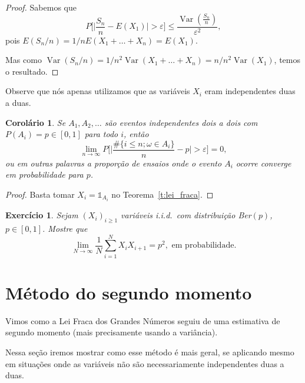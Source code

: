 \documentclass[reqno, draft]{book}
\newcommand*\1{\mathds{1}}
\newtheorem{corollary}[theorem]{Corolário}
\newtheorem{exercise}[example]{Exercício}
\DeclareMathOperator{\Var}{Var}
\def \iid{i.i.d.~}
\begin{document}
\begin{proof}
  Sabemos que
  \begin{equation}
    P \Big[\Big| \frac{S_n}{n} - E(X_1)\Big| > \varepsilon \Big] \leq \frac{\Var(\tfrac{S_n}{n})}{\varepsilon^2},
  \end{equation}
  pois $E(S_n/n) = 1/n E(X_1 + \dots + X_n) = E(X_1)$.

  Mas como $\Var(S_n/n) = 1/n^2 \Var (X_1 + \dots + X_n) = n/n^2 \Var(X_1)$, temos o resultado.
\end{proof}

Observe que nós apenas utilizamos que as variáveis $X_i$ eram independentes duas a duas.

\begin{corollary}
  Se $A_1, A_2, \dots$ são eventos independentes dois a dois com $P(A_i) = p \in [0,1]$ para todo $i$, então
  \begin{equation}
    \lim_{n \to \infty} P \Big[ \Big| \frac{\#\{i \leq n; \omega \in A_i\}}{n} - p \Big| > \varepsilon \Big] = 0,
  \end{equation}
  ou em outras palavras a proporção de ensaios onde o evento $A_i$ ocorre converge em probabilidade para $p$.
\end{corollary}

\begin{proof}
  Basta tomar $X_i = \1_{A_i}$ no Teorema~\ref{t:lei_fraca}.
\end{proof}

\begin{exercise}
  Sejam $(X_i)_{i \geq 1}$ variáveis \iid com distribui\c{c}\~ao Ber$(p)$, $p \in [0,1]$. Mostre que
  \begin{equation}
    \lim_{N \to \infty} \frac 1N \sum_{i = 1}^N X_i X_{i+1} = p^2, \text{ em probabilidade.}
  \end{equation}
\end{exercise}


\section{Método do segundo momento}

Vimos como a Lei Fraca dos Grandes Números seguiu de uma estimativa de segundo momento  (mais precisamente usando a variância).

Nessa seção iremos mostrar como esse método é mais geral, se aplicando mesmo em situações onde as variáveis não são necessariamente independentes duas a duas.
\end{document}
